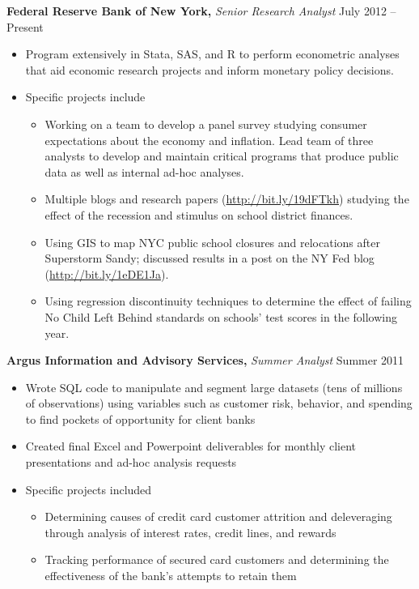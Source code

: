 \documentclass{res}
\begin{document}
\begin{resume}
  {\bf Federal Reserve Bank of New York,} {\it Senior Research Analyst}  \hfill  July 2012 -- Present
  \begin{itemize} \itemsep -1.5pt %
  \item Program extensively in Stata, SAS, and R to perform econometric analyses that aid economic research projects and inform monetary policy decisions.
  \item Specific projects include 
    \setlength{\parskip}{-1.75pt} 
    \begin{itemize}
      \setlength{\itemsep}{1.5pt}
    \item Working on a team to develop a panel survey studying consumer expectations about the economy and inflation. Lead team of three analysts to develop and maintain critical programs that produce public data as well as internal ad-hoc analyses.
    \item Multiple blogs and research papers (\href{http://bit.ly/19dFTkh}{http://bit.ly/19dFTkh}) studying the effect of the recession and stimulus on school district finances.
    \item Using GIS to map NYC public school closures and relocations after Superstorm Sandy; discussed results in a post on the NY Fed blog (\href{http://bit.ly/1eDE1Ja}{http://bit.ly/1eDE1Ja}).
    \item Using regression discontinuity techniques to determine the effect of failing No Child Left Behind standards on schools' test scores in the following year.
    
    \end{itemize}
  \end{itemize}

  {\bf Argus Information and Advisory Services,} {\it Summer Analyst} \hfill Summer 2011
  \begin{itemize} \itemsep -2pt
  \item Wrote SQL code to manipulate and segment large datasets (tens of millions of observations) using variables such as customer risk, behavior, and spending to find pockets of opportunity for client banks
  \item Created final Excel and Powerpoint deliverables for monthly client presentations and ad-hoc analysis requests
  \item Specific projects included \setlength{\parskip}{-1.75pt} \begin{itemize}
      \setlength{\itemsep}{1.5pt}
    \item Determining causes of credit card customer attrition and deleveraging through analysis of interest rates, credit lines, and rewards
    \item Tracking performance of secured card customers and determining the effectiveness of the bank's attempts to retain them
    \end{itemize}
  \end{itemize}


\end{resume}
\end{document}
